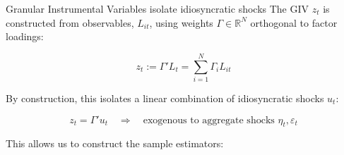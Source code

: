 \documentclass[aspectratio=169,11pt]{beamer}
\begin{document}
\begin{frame}[shrink,label=app_propositions]{Granular Instrumental Variables isolate idiosyncratic shocks}
    \vspace{0.2cm}
    \centering
    The GIV $z_t$ is constructed from observables, $L_{it}$, using weights $\Gamma \in \mathbb{R}^N$ orthogonal to factor loadings:

    \vspace{0.1cm}
    \begin{equation*}
        z_t := \Gamma' L_t = \sum_{i=1}^{N} \Gamma_i L_{it}
    \end{equation*}

    \vspace{0.1cm}
    By construction, this isolates a linear combination of idiosyncratic shocks $u_t$:

    \vspace{0.1cm}
    \begin{equation*}
        z_t = \Gamma' u_t \quad \Rightarrow \quad \text{exogenous to aggregate shocks } \eta_t, \varepsilon_t
    \end{equation*}

    \vspace{0.2cm}
    This allows us to construct the sample estimators:
    \vspace{0.1cm}

    \vspace{0.1cm}
    \hfill \hyperlink{src_propositions}{}
\end{frame}
\end{document}
